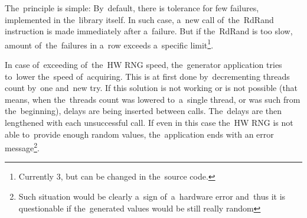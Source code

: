\par{
The~principle is simple: By~default, there is tolerance for few failures, implemented in the~library itself. In such case, a~new call of~the~RdRand instruction is made immediately after a~failure. But if the~RdRand is too slow, amount of~the~failures in a~row exceeds a~specific limit\footnote{Currently 3, but can be changed in the~source code.}. 
}

\par{
In case of~exceeding of~the~HW RNG speed, the~generator application tries to~lower the~speed of~acquiring. This is at first done by~decrementing threads count by~one and~new try. If this solution is not working or is not possible (that means, when the~threads count was lowered to~a~single thread, or was such from the~beginning), delays are being inserted between calls. The~delays are then lengthened with each unsuccessful call. If even in this case the~HW RNG is not able to~provide enough random values, the~application ends with an error message\footnote{Such situation would be clearly a~sign of~a~hardware error and~thus it is questionable if the~generated values would be still really random}.
}
